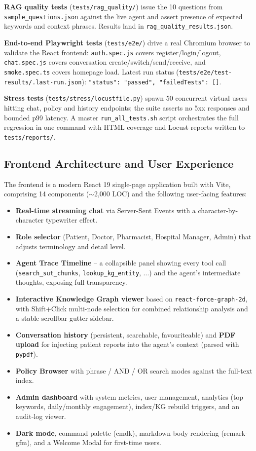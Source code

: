 \documentclass[11pt, a4paper]{article}
\begin{document}
\textbf{RAG quality tests} (\texttt{tests/rag\_quality/}) issue the 10 questions from \texttt{sample\_questions.json} against the live agent and assert presence of expected keywords and context phrases. Results land in \texttt{rag\_quality\_results.json}.

\textbf{End-to-end Playwright tests} (\texttt{tests/e2e/}) drive a real Chromium browser to validate the React frontend: \texttt{auth.spec.js} covers register/login/logout, \texttt{chat.spec.js} covers conversation create/switch/send/receive, and \texttt{smoke.spec.ts} covers homepage load. Latest run status (\texttt{tests/e2e/test-results/.last-run.json}): \texttt{"status": "passed", "failedTests": []}.

\textbf{Stress tests} (\texttt{tests/stress/locustfile.py}) spawn 50 concurrent virtual users hitting chat, policy and history endpoints; the suite asserts no 5xx responses and bounded p99 latency. A master \texttt{run\_all\_tests.sh} script orchestrates the full regression in one command with HTML coverage and Locust reports written to \texttt{tests/reports/}.

\subsection{Frontend Architecture and User Experience}

The frontend is a modern React 19 single-page application built with Vite, comprising 14 components ($\sim$2{,}000 LOC) and the following user-facing features:

\begin{itemize}[leftmargin=*]
    \item \textbf{Real-time streaming chat} via Server-Sent Events with a character-by-character typewriter effect.
    \item \textbf{Role selector} (Patient, Doctor, Pharmacist, Hospital Manager, Admin) that adjusts terminology and detail level.
    \item \textbf{Agent Trace Timeline} -- a collapsible panel showing every tool call (\texttt{search\_sut\_chunks}, \texttt{lookup\_kg\_entity}, ...) and the agent's intermediate thoughts, exposing full transparency.
    \item \textbf{Interactive Knowledge Graph viewer} based on \texttt{react-force-graph-2d}, with Shift+Click multi-node selection for combined relationship analysis and a stable scrollbar gutter sidebar.
    \item \textbf{Conversation history} (persistent, searchable, favouriteable) and \textbf{PDF upload} for injecting patient reports into the agent's context (parsed with \texttt{pypdf}).
    \item \textbf{Policy Browser} with phrase / AND / OR search modes against the full-text index.
    \item \textbf{Admin dashboard} with system metrics, user management, analytics (top keywords, daily/monthly engagement), index/KG rebuild triggers, and an audit-log viewer.
    \item \textbf{Dark mode}, command palette (cmdk), markdown body rendering (remark-gfm), and a Welcome Modal for first-time users.
\end{itemize}
\end{document}
